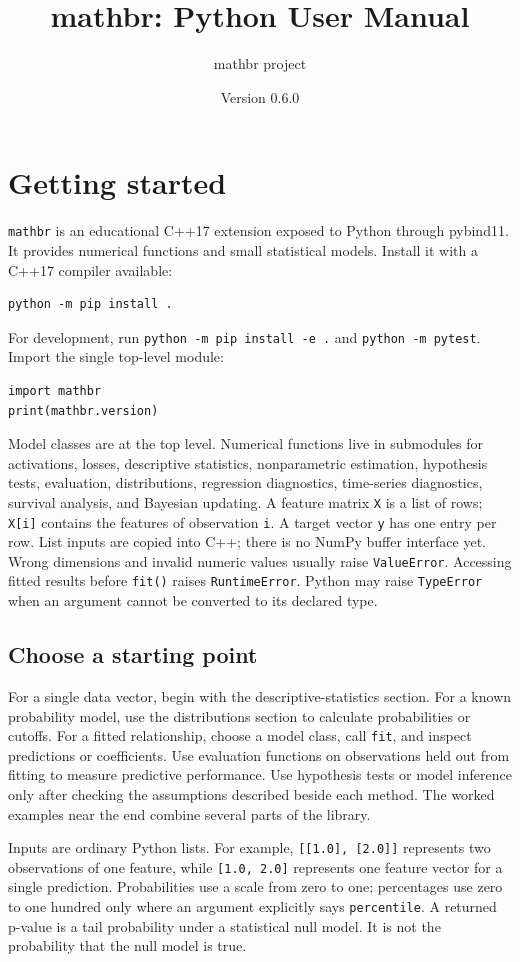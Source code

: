 \documentclass[11pt,a4paper]{article}
\title{mathbr: Python User Manual}
\author{mathbr project}
\date{Version 0.6.0}
\begin{document}
\maketitle
\tableofcontents

\section{Getting started}
\texttt{mathbr} is an educational C++17 extension exposed to Python through pybind11. It provides numerical functions and small statistical models. Install it with a C++17 compiler available:
\begin{verbatim}
python -m pip install .
\end{verbatim}
For development, run \verb|python -m pip install -e .| and \verb|python -m pytest|. Import the single top-level module:
\begin{verbatim}
import mathbr
print(mathbr.version)
\end{verbatim}
Model classes are at the top level. Numerical functions live in submodules for activations, losses, descriptive statistics, nonparametric estimation, hypothesis tests, evaluation, distributions, regression diagnostics, time-series diagnostics, survival analysis, and Bayesian updating. A feature matrix \verb|X| is a list of rows; \verb|X[i]| contains the features of observation \verb|i|. A target vector \verb|y| has one entry per row. List inputs are copied into C++; there is no NumPy buffer interface yet. Wrong dimensions and invalid numeric values usually raise \verb|ValueError|. Accessing fitted results before \verb|fit()| raises \verb|RuntimeError|. Python may raise \verb|TypeError| when an argument cannot be converted to its declared type.

\subsection{Choose a starting point}
For a single data vector, begin with the descriptive-statistics section. For a known probability model, use the distributions section to calculate probabilities or cutoffs. For a fitted relationship, choose a model class, call \verb|fit|, and inspect predictions or coefficients. Use evaluation functions on observations held out from fitting to measure predictive performance. Use hypothesis tests or model inference only after checking the assumptions described beside each method. The worked examples near the end combine several parts of the library.

Inputs are ordinary Python lists. For example, \verb|[[1.0], [2.0]]| represents two observations of one feature, while \verb|[1.0, 2.0]| represents one feature vector for a single prediction. Probabilities use a scale from zero to one; percentages use zero to one hundred only where an argument explicitly says \verb|percentile|. A returned p-value is a tail probability under a statistical null model. It is not the probability that the null model is true.
\end{document}
